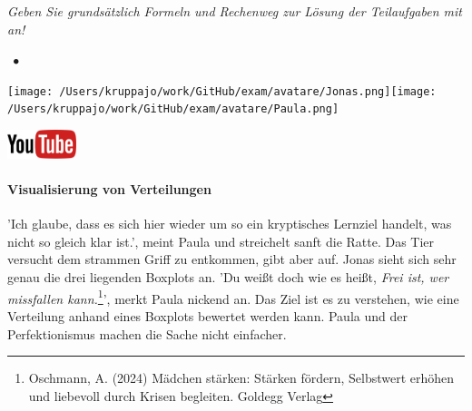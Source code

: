 \documentclass[a4paper, 9pt]{scrartcl}\usepackage[]{graphicx}\usepackage[]{xcolor}
\begin{document}
\textit{Geben Sie grundsätzlich Formeln und Rechenweg zur Lösung der Teilaufgaben mit an!} \\[1Ex]
 

 
\ifcollection
\begin{flushright}
\tiny\vspace{-3Ex}
\textbf{\examinhaltstart}
\exammodulestatversuch $\;\bullet$
\exammodulebiostat
\vspace{-4Ex}
\end{flushright}
\begin{minipage}[t]{0.5\textwidth}
\texttt{[image: /Users/kruppajo/work/GitHub/exam/avatare/Jonas.png]}\hspace{-4mm}\texttt{[image: /Users/kruppajo/work/GitHub/exam/avatare/Paula.png]}
\end{minipage}
\begin{minipage}[t]{0.5\textwidth}
\hfill
\href{https://youtu.be/Op-gjzASH9I}{\includegraphics[width = 2cm]{img/youtube}}
\end{minipage}
\fi



\ifcollection
\paragraph{Visualisierung von Verteilungen}
\fi

'Ich glaube, dass es sich hier wieder um so ein kryptisches Lernziel handelt, was nicht so gleich klar ist.', meint Paula und streichelt sanft die Ratte. Das Tier versucht dem strammen Griff zu entkommen, gibt aber auf. Jonas sieht sich sehr genau die drei liegenden Boxplots an. 'Du weißt doch wie es heißt, \textit{Frei ist, wer missfallen kann.}\footnote{Oschmann, A. (2024) Mädchen stärken: Stärken fördern, Selbstwert erhöhen und liebevoll durch Krisen begleiten. Goldegg Verlag}', merkt Paula nickend an. Das Ziel ist es zu verstehen, wie eine Verteilung anhand eines Boxplots bewertet werden kann. Paula und der Perfektionismus machen die Sache nicht einfacher.
\end{document}
